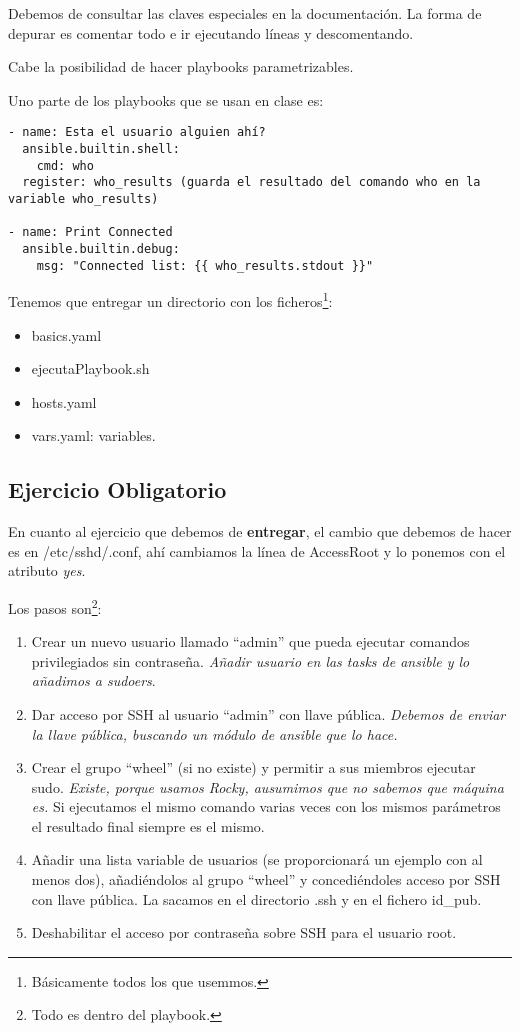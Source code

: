Debemos de consultar las claves especiales en la documentación. La forma de depurar es comentar todo e ir ejecutando líneas y descomentando.

Cabe la posibilidad de hacer playbooks parametrizables.

Uno parte de los playbooks que se usan en clase es:

\begin{lstlisting}[style=yamlstyle]
- name: Esta el usuario alguien ahí?
  ansible.builtin.shell:
    cmd: who
  register: who_results (guarda el resultado del comando who en la variable who_results)

- name: Print Connected
  ansible.builtin.debug:
    msg: "Connected list: {{ who_results.stdout }}"
\end{lstlisting}

Tenemos que entregar un directorio con los ficheros\footnote{Básicamente todos los que usemmos.}: \begin{itemize}
    \item basics.yaml 
    \item ejecutaPlaybook.sh
    \item hosts.yaml
    \item vars.yaml: variables.
\end{itemize}


\subsection{Ejercicio Obligatorio}

En cuanto al ejercicio que debemos de \textbf{entregar}, el cambio que debemos de hacer es en /etc/sshd/.conf, ahí cambiamos la línea de AccessRoot y lo ponemos con el atributo \textit{yes}.

Los pasos son\footnote{Todo es dentro del playbook.}:
\begin{enumerate}
    \item Crear un nuevo usuario llamado “admin” que pueda ejecutar comandos privilegiados sin contraseña. \textit{Añadir usuario en las tasks de ansible y lo añadimos a sudoers}.
    \item Dar acceso por SSH al usuario “admin” con llave pública. \textit{Debemos de enviar la llave pública, buscando un módulo de ansible que lo hace.}
    \item Crear el grupo “wheel” (si no existe) y permitir a sus miembros ejecutar sudo. \textit{Existe, porque usamos Rocky, ausumimos que no sabemos que máquina es.} Si ejecutamos el mismo comando varias veces con los mismos parámetros el resultado final siempre es el mismo.
    \item Añadir una lista variable de usuarios (se proporcionará un ejemplo con al menos dos), añadiéndolos al grupo “wheel” y concediéndoles acceso por SSH con llave pública. La sacamos en el directorio .ssh y en el fichero id\_pub.
    \item Deshabilitar el acceso por contraseña sobre SSH para el usuario root.
\end{enumerate}

